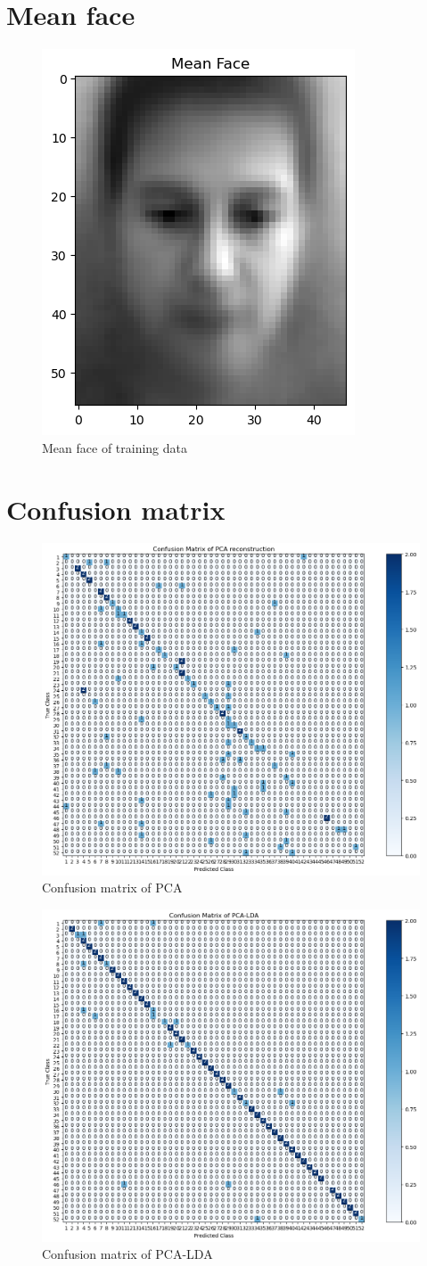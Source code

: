 \section{Mean face}
\begin{figure}[htbp]
	\centering
	\includegraphics[width=0.4\linewidth]{image/q1_meanface.png} 
	\caption{Mean face of training data}
	\label{fig:q1_meanface}
\end{figure}

\section{Confusion matrix}
\begin{figure}[htbp]
	\centering
	\includegraphics[width=0.4\linewidth]{image/q1_cm.png}
	\caption{Confusion matrix of PCA}
	\label{fig:q1_cm}
\end{figure}

\begin{figure}[htbp]
	\centering
	\includegraphics[width=0.4\linewidth]{image/q3_1_cm.png} %
	
	\caption{Confusion matrix of PCA-LDA}
	\label{fig:q3_1_cm}
\end{figure}

